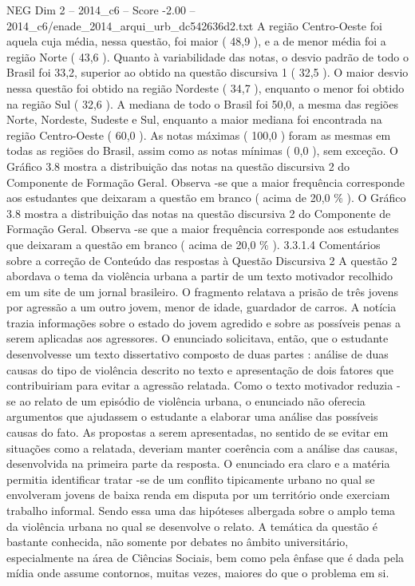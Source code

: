 \begin{textsample}{NEG Dim 2 – 2014\_c6 – Score -2.00 – 2014\_c6/enade\_2014\_arqui\_urb\_dc542636d2.txt}
A região Centro-Oeste foi aquela cuja média, nessa questão, foi maior ( 48,9 ), e a de menor média foi a região Norte ( 43,6 ).
Quanto à variabilidade das notas, o desvio padrão de todo o Brasil foi 33,2, superior ao obtido na questão discursiva 1 ( 32,5 ).
O maior desvio nessa questão foi obtido na região Nordeste ( 34,7 ), enquanto o menor foi obtido na região Sul ( 32,6 ).
A mediana de todo o Brasil foi 50,0, a mesma das regiões Norte, Nordeste, Sudeste e Sul, enquanto a maior mediana foi encontrada na região Centro-Oeste ( 60,0 ).
As notas máximas ( 100,0 ) foram as mesmas em todas as regiões do Brasil, assim como as notas mínimas ( 0,0 ), sem exceção.
O Gráfico 3.8 mostra a distribuição das notas na questão discursiva 2 do Componente de Formação Geral.
Observa -se que a maior frequência corresponde aos estudantes que deixaram a questão em branco ( acima de 20,0 \% ).
O Gráfico 3.8 mostra a distribuição das notas na questão discursiva 2 do Componente de Formação Geral.
Observa -se que a maior frequência corresponde aos estudantes que deixaram a questão em branco ( acima de 20,0 \% ). 3.3.1.4 Comentários sobre a correção de Conteúdo das respostas à Questão Discursiva 2 A questão 2 abordava o tema da violência urbana a partir de um texto motivador recolhido em um site de um jornal brasileiro.
O fragmento relatava a prisão de três jovens por agressão a um outro jovem, menor de idade, guardador de carros.
A notícia trazia informações sobre o estado do jovem agredido e sobre as possíveis penas a serem aplicadas aos agressores.
O enunciado solicitava, então, que o estudante desenvolvesse um texto dissertativo composto de duas partes : análise de duas causas do tipo de violência descrito no texto e apresentação de dois fatores que contribuiriam para evitar a agressão relatada.
Como o texto motivador reduzia -se ao relato de um episódio de violência urbana, o enunciado não oferecia argumentos que ajudassem o estudante a elaborar uma análise das possíveis causas do fato.
As propostas a serem apresentadas, no sentido de se evitar em situações como a relatada, deveriam manter coerência com a análise das causas, desenvolvida na primeira parte da resposta.
O enunciado era claro e a matéria permitia identificar tratar -se de um conflito tipicamente urbano no qual se envolveram jovens de baixa renda em disputa por um território onde exerciam trabalho informal.
Sendo essa uma das hipóteses albergada sobre o amplo tema da violência urbana no qual se desenvolve o relato.
A temática da questão é bastante conhecida, não somente por debates no âmbito universitário, especialmente na área de Ciências Sociais, bem como pela ênfase que é dada pela mídia onde assume contornos, muitas vezes, maiores do que o problema em si.

\end{textsample}
